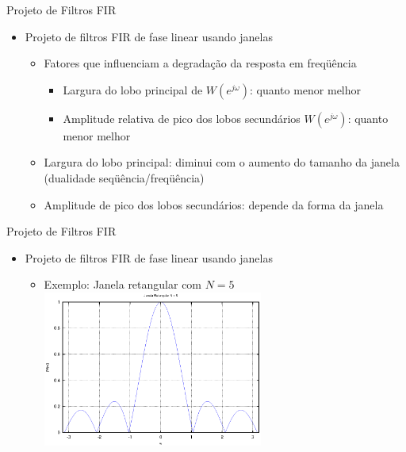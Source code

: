 \begin{slide}{Projeto de Filtros FIR}
\begin{itemize}
   \item Projeto de filtros FIR de fase linear usando janelas 
   \begin{itemize}
      \item Fatores que influenciam a degradação da resposta em freqüência
      \begin{itemize}
         \item Largura do lobo principal de $W(e^{j\omega})$: quanto menor melhor
         \item Amplitude relativa de pico dos lobos secundários $W(e^{j\omega})$: quanto menor melhor
      \end{itemize}
      \item Largura do lobo principal: diminui com o aumento do tamanho da janela (dualidade seqüência/freqüência)
      \item Amplitude de pico dos lobos secundários: depende da forma da janela
   \end{itemize}
\end{itemize}
\end{slide}

\begin{slide}{Projeto de Filtros FIR}
\begin{itemize}
   \item Projeto de filtros FIR de fase linear usando janelas 
   \begin{itemize}
      \item Exemplo: Janela retangular com $N=5$
      \includegraphics[width=0.6\textwidth]{figs/w_ret_5.eps}
   \end{itemize}
\end{itemize}
\end{slide}

